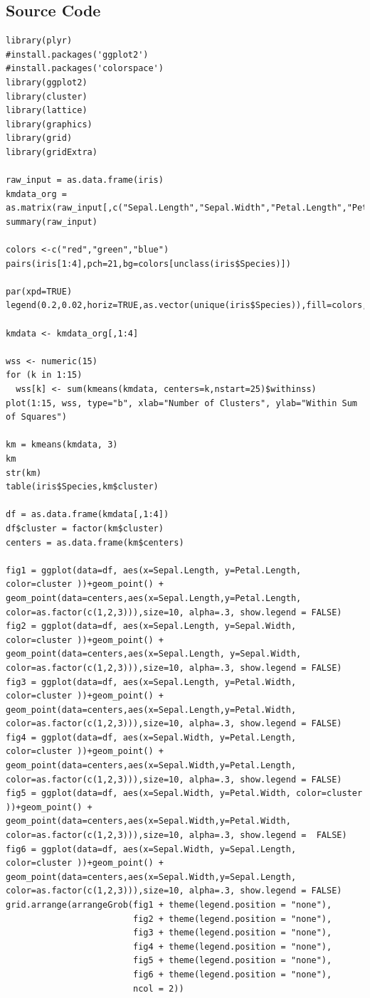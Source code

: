 \documentclass{article}
\begin{document}
\subsection{Source Code}
\begin{lstlisting}
library(plyr)
#install.packages('ggplot2')
#install.packages('colorspace')
library(ggplot2)
library(cluster)
library(lattice)
library(graphics)
library(grid) 
library(gridExtra)

raw_input = as.data.frame(iris)
kmdata_org = as.matrix(raw_input[,c("Sepal.Length","Sepal.Width","Petal.Length","Petal.Width","Species")])
summary(raw_input)

colors <-c("red","green","blue")
pairs(iris[1:4],pch=21,bg=colors[unclass(iris$Species)])

par(xpd=TRUE)
legend(0.2,0.02,horiz=TRUE,as.vector(unique(iris$Species)),fill=colors,bty="n")

kmdata <- kmdata_org[,1:4]

wss <- numeric(15)
for (k in 1:15) 
  wss[k] <- sum(kmeans(kmdata, centers=k,nstart=25)$withinss)
plot(1:15, wss, type="b", xlab="Number of Clusters", ylab="Within Sum of Squares")

km = kmeans(kmdata, 3)
km
str(km)
table(iris$Species,km$cluster)

df = as.data.frame(kmdata[,1:4])
df$cluster = factor(km$cluster)
centers = as.data.frame(km$centers)

fig1 = ggplot(data=df, aes(x=Sepal.Length, y=Petal.Length, color=cluster ))+geom_point() + geom_point(data=centers,aes(x=Sepal.Length,y=Petal.Length, color=as.factor(c(1,2,3))),size=10, alpha=.3, show.legend = FALSE)
fig2 = ggplot(data=df, aes(x=Sepal.Length, y=Sepal.Width, color=cluster ))+geom_point() + geom_point(data=centers,aes(x=Sepal.Length, y=Sepal.Width, color=as.factor(c(1,2,3))),size=10, alpha=.3, show.legend = FALSE)
fig3 = ggplot(data=df, aes(x=Sepal.Length, y=Petal.Width, color=cluster ))+geom_point() + geom_point(data=centers,aes(x=Sepal.Length,y=Petal.Width, color=as.factor(c(1,2,3))),size=10, alpha=.3, show.legend = FALSE)
fig4 = ggplot(data=df, aes(x=Sepal.Width, y=Petal.Length, color=cluster ))+geom_point() + geom_point(data=centers,aes(x=Sepal.Width,y=Petal.Length, color=as.factor(c(1,2,3))),size=10, alpha=.3, show.legend = FALSE)
fig5 = ggplot(data=df, aes(x=Sepal.Width, y=Petal.Width, color=cluster ))+geom_point() + geom_point(data=centers,aes(x=Sepal.Width,y=Petal.Width, color=as.factor(c(1,2,3))),size=10, alpha=.3, show.legend =  FALSE)
fig6 = ggplot(data=df, aes(x=Sepal.Width, y=Sepal.Length, color=cluster ))+geom_point() + geom_point(data=centers,aes(x=Sepal.Width,y=Sepal.Length, color=as.factor(c(1,2,3))),size=10, alpha=.3, show.legend = FALSE)
grid.arrange(arrangeGrob(fig1 + theme(legend.position = "none"),
                         fig2 + theme(legend.position = "none"),
                         fig3 + theme(legend.position = "none"),
                         fig4 + theme(legend.position = "none"),
                         fig5 + theme(legend.position = "none"),
                         fig6 + theme(legend.position = "none"),
                         ncol = 2))


\end{lstlisting}
\end{document}
